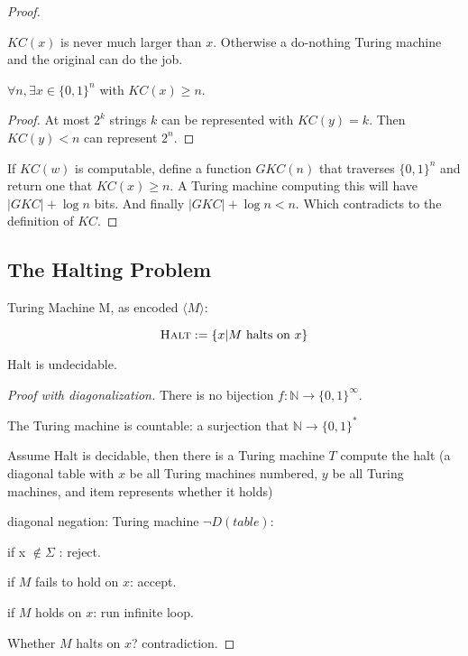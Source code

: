 \begin{proof}
\begin{observation}
$KC(x)$ is never much larger than $x$. Otherwise a do-nothing Turing machine and the original can do the job.
\end{observation}

\begin{lemma}
$\forall n, \exists x \in \{0,1\}^n$ with $KC(x) \ge n$.
\end{lemma}

\begin{proof}
At most $2^k$ strings $k$ can be represented with $KC(y)=k$. Then $KC(y)< n$ can represent $2^{n}$.
\end{proof}

If $KC(w)$ is computable, define a function $GKC(n)$ that traverses $\{0,1\}^n$ and return one that $KC(x) \ge n$. A Turing machine computing this will have $|GKC| + \log n$ bits. And finally $|GKC| + \log n < n$. Which contradicts to the definition of $KC$.

\end{proof}

\subsection{The Halting Problem}

Turing Machine M, as encoded $\langle M \rangle$:

$$\text{\textsc{Halt}}:=\{x | M \text{ halts on }x\}$$

\begin{theorem}
Halt is undecidable.
\end{theorem}

\begin{proof}[Proof with diagonalization]
There is no bijection
\(f: \mathbb{N} \rightarrow \{0,1\}^\infty\).

The Turing machine is countable: a surjection that $\mathbb{N}
\rightarrow \{0,1\}^*$

Assume Halt is decidable, then there is a Turing machine $T$ compute the
halt (a diagonal table with $x$ be all Turing machines numbered, $y$ be all Turing machines, and item represents whether it holds)

diagonal negation: Turing machine $\lnot D(table)$:

if x $\not\in \Sigma$ : reject.

if $M$ fails to hold on $x$: accept.

if $M$ holds on $x$: run infinite loop.

Whether $M$ halts on $x$? contradiction.
\end{proof}




